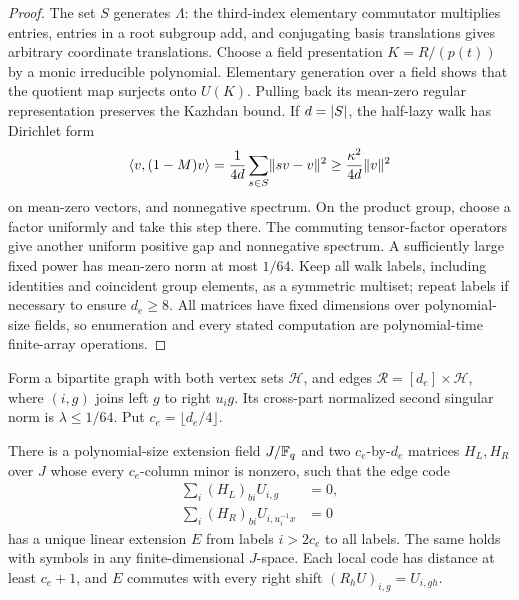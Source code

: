 \begin{proof}
The set \(S\) generates \(\Lambda\): the third-index elementary
commutator multiplies entries, entries in a root subgroup add, and
conjugating basis translations gives arbitrary coordinate
translations.  Choose a field presentation
\(K=R/(p(t))\) by a monic irreducible polynomial.  Elementary
generation over a field shows that the quotient map surjects onto
\(U(K)\).  Pulling back its mean-zero regular representation
preserves the Kazhdan bound.  If \(d=\lvert S\rvert\), the half-lazy walk
has Dirichlet form
\[
 \langle v,(1-M)v\rangle
   =\frac{1}{4d}\sum_{s\in S}\lVert sv-v\rVert^2
   \ge\frac{\kappa^2}{4d}\lVert v\rVert^2
\]
on mean-zero vectors, and nonnegative spectrum.  On the product
group, choose a factor uniformly and take this step there.  The
commuting tensor-factor operators give another uniform positive
gap and nonnegative spectrum.  A sufficiently large fixed power has
mean-zero norm at most \(1/64\).  Keep all walk labels, including
identities and coincident group elements, as a symmetric multiset;
repeat labels if necessary to ensure \(d_e\ge8\).  All matrices
have fixed dimensions over polynomial-size fields, so enumeration
and every stated computation are polynomial-time finite-array
operations.
\end{proof}

Form a bipartite graph with both vertex sets \(\mathcal H\), and
edges
\(\mathcal R=[d_e]\times\mathcal H\), where \((i,g)\) joins
left \(g\) to right \(u_i g\).  Its cross-part normalized second
singular norm is \(\lambda\le1/64\).  Put
\(c_e=\lfloor d_e/4\rfloor\).

\begin{lemma}
\label{ib:row-extension}
There is a polynomial-size extension field \(J/\mathbb{F}_q\) and two
\(c_e\)-by-\(d_e\) matrices \(H_L,H_R\) over \(J\) whose every
\(c_e\)-column minor is nonzero, such that the edge code
\begin{align}
 \sum_i(H_L)_{bi}U_{i,g}&=0,\label{ib:left-row}\\
 \sum_i(H_R)_{bi}U_{i,u_i^{-1}x}&=0\label{ib:right-row}
\end{align}
has a unique linear extension \(E\) from labels \(i>2c_e\) to all
labels.  The same holds with symbols in any finite-dimensional
\(J\)-space.  Each local code has distance at least \(c_e+1\),
and \(E\) commutes with every right shift
\((R_hU)_{i,g}=U_{i,gh}\).
\end{lemma}

